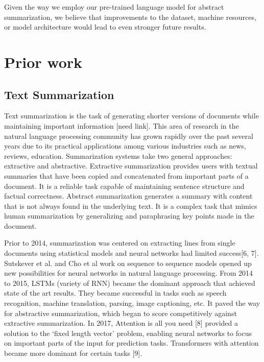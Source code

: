 \documentclass{article}
\begin{document}
Given the way we employ our pre-trained language model for abstract summarization, we believe that improvements to the dataset, machine resources, or model architecture would lead to even stronger future results. 

\section{Prior work}

\subsection{Text Summarization}

Text summarization is the task of generating shorter versions of documents while maintaining important information [need link]. This area of research in the natural language processing community has grown rapidly over the past several years due to its practical applications among various industries such as news, reviews, education. Summarization systems take two general approaches: extractive and abstractive. Extractive summarization provides users with textual summaries that have been copied and concatenated from important parts of a document. It is a reliable task capable of maintaining sentence structure and factual correctness. Abstract summarization generates a summary with content that is not always found in the underlying text. It is a complex task that mimics human summarization by generalizing and paraphrasing key points made in the document. 

Prior to 2014, summarization was centered on extracting lines from single documents using statistical models and neural networks had limited success[6, 7]. Sutskever et al. and Cho et al work on sequence to sequence models opened up new possibilities for neural networks in natural language processing. From 2014 to 2015, LSTMs (variety of RNN) became the dominant approach that achieved state of the art results. They became successful in tasks such as speech recognition, machine translation, parsing, image captioning, etc. It paved the way for abstractive summarization, which began to score competitively against extractive summarization. In 2017, Attention is all you need [8] provided a solution to the ‘fixed length vector’ problem, enabling neural networks to focus on important parts of the input for prediction tasks. Transformers with attention became more dominant for certain tasks [9].
\end{document}

